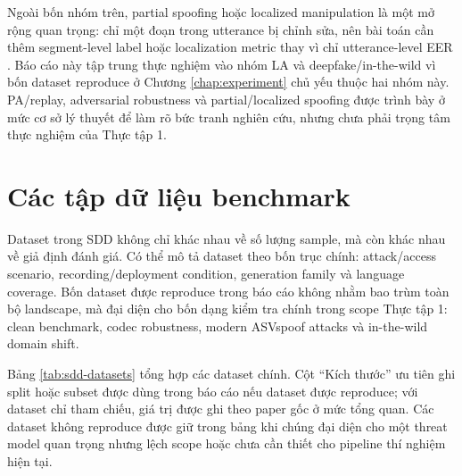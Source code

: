 Ngoài bốn nhóm trên, partial spoofing hoặc localized manipulation là một mở rộng quan trọng: chỉ một đoạn trong utterance bị chỉnh sửa, nên bài toán cần thêm segment-level label hoặc localization metric thay vì chỉ utterance-level EER \cite{partialspoof,add2022,add2023}. Báo cáo này tập trung thực nghiệm vào nhóm LA và deepfake/in-the-wild vì bốn dataset reproduce ở Chương \ref{chap:experiment} chủ yếu thuộc hai nhóm này. PA/replay, adversarial robustness và partial/localized spoofing được trình bày ở mức cơ sở lý thuyết để làm rõ bức tranh nghiên cứu, nhưng chưa phải trọng tâm thực nghiệm của Thực tập 1.

\section{Các tập dữ liệu benchmark}

Dataset trong SDD không chỉ khác nhau về số lượng sample, mà còn khác nhau về giả định đánh giá. Có thể mô tả dataset theo bốn trục chính: attack/access scenario, recording/deployment condition, generation family và language coverage. Bốn dataset được reproduce trong báo cáo không nhằm bao trùm toàn bộ landscape, mà đại diện cho bốn dạng kiểm tra chính trong scope Thực tập 1: clean benchmark, codec robustness, modern ASVspoof attacks và in-the-wild domain shift.

Bảng \ref{tab:sdd-datasets} tổng hợp các dataset chính. Cột ``Kích thước'' ưu tiên ghi split hoặc subset được dùng trong báo cáo nếu dataset được reproduce; với dataset chỉ tham chiếu, giá trị được ghi theo paper gốc ở mức tổng quan. Các dataset không reproduce được giữ trong bảng khi chúng đại diện cho một threat model quan trọng nhưng lệch scope hoặc chưa cần thiết cho pipeline thí nghiệm hiện tại.

